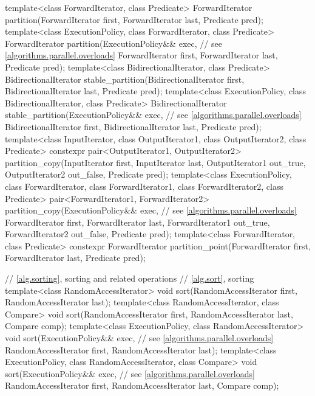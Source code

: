 \begin{codeblock}
{  template<class ForwardIterator, class Predicate>
    ForwardIterator partition(ForwardIterator first,
                              ForwardIterator last,
                              Predicate pred);
  template<class ExecutionPolicy, class ForwardIterator, class Predicate>
    ForwardIterator partition(ExecutionPolicy&& exec, // see \ref{algorithms.parallel.overloads}
                              ForwardIterator first,
                              ForwardIterator last,
                              Predicate pred);
  template<class BidirectionalIterator, class Predicate>
    BidirectionalIterator stable_partition(BidirectionalIterator first,
                                           BidirectionalIterator last,
                                           Predicate pred);
  template<class ExecutionPolicy, class BidirectionalIterator, class Predicate>
    BidirectionalIterator stable_partition(ExecutionPolicy&& exec, // see \ref{algorithms.parallel.overloads}
                                           BidirectionalIterator first,
                                           BidirectionalIterator last,
                                           Predicate pred);
  template<class InputIterator, class OutputIterator1,
           class OutputIterator2, class Predicate>
    constexpr pair<OutputIterator1, OutputIterator2>
      partition_copy(InputIterator first, InputIterator last,
                     OutputIterator1 out_true, OutputIterator2 out_false,
                     Predicate pred);
  template<class ExecutionPolicy, class ForwardIterator, class ForwardIterator1,
           class ForwardIterator2, class Predicate>
    pair<ForwardIterator1, ForwardIterator2>
      partition_copy(ExecutionPolicy&& exec, // see \ref{algorithms.parallel.overloads}
                     ForwardIterator first, ForwardIterator last,
                     ForwardIterator1 out_true, ForwardIterator2 out_false,
                     Predicate pred);
  template<class ForwardIterator, class Predicate>
    constexpr ForwardIterator
      partition_point(ForwardIterator first, ForwardIterator last,
                      Predicate pred);

  // \ref{alg.sorting}, sorting and related operations
  // \ref{alg.sort}, sorting
  template<class RandomAccessIterator>
    void sort(RandomAccessIterator first, RandomAccessIterator last);
  template<class RandomAccessIterator, class Compare>
    void sort(RandomAccessIterator first, RandomAccessIterator last,
              Compare comp);
  template<class ExecutionPolicy, class RandomAccessIterator>
    void sort(ExecutionPolicy&& exec, // see \ref{algorithms.parallel.overloads}
              RandomAccessIterator first, RandomAccessIterator last);
  template<class ExecutionPolicy, class RandomAccessIterator, class Compare>
    void sort(ExecutionPolicy&& exec, // see \ref{algorithms.parallel.overloads}
              RandomAccessIterator first, RandomAccessIterator last,
              Compare comp);

}
\end{codeblock}
